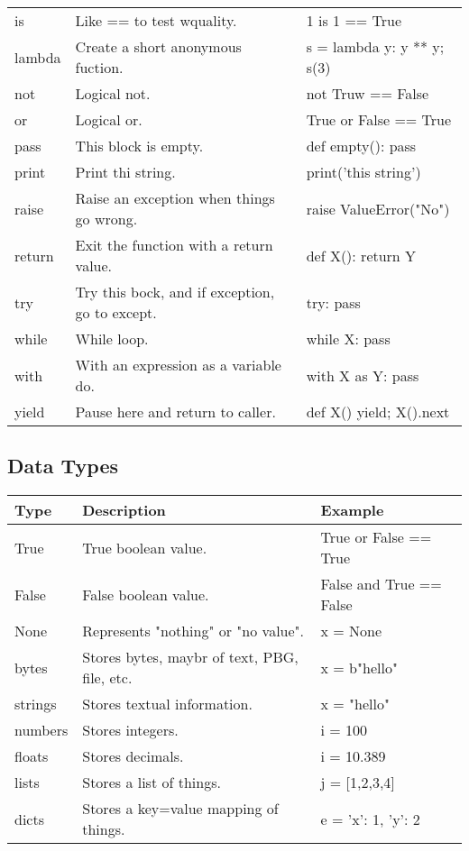 \documentclass[12pt]{article}
\begin{document}
\begin{tabular}{|l|p{3in}|l|}
	is & Like == to test wquality. & 1 is 1 == True\\
	lambda & Create a short anonymous fuction. & s = lambda y: y ** y; s(3)\\
	not & Logical not. & not Truw == False\\
	or & Logical or. & True or False == True\\
	pass & This block is empty. & def empty(): pass\\
	print & Print thi string. & print('this string')\\
	raise & Raise an exception when things go wrong. & raise ValueError("No")\\
	return & Exit the function with a return value. & def X(): return Y\\
	try & Try this bock, and if exception, go to except. & try: pass\\
	while & While loop. & while X: pass\\
	with & With an expression as a variable do. & with X as Y: pass\\
	yield & Pause here and return to caller. & def X() yield; X().next\\

	\hline
\end{tabular}

\subsection{Data Types}
\begin{tabular}{|l|l|p{3in}|}
	\hline
	\textbf{Type} & \textbf{Description} & \textbf{Example}\\ \hline
	True & True boolean value. & True or False == True\\
	False & False boolean value. & False and True == False\\
	None & Represents "nothing" or "no value". & x = None\\
	bytes & Stores bytes, maybr of text, PBG, file, etc. & x = b"hello"\\
	strings & Stores textual information. & x = "hello"\\
	numbers & Stores integers. & i = 100\\
	floats & Stores decimals. & i = 10.389\\
	lists & Stores a list of things. & j = [1,2,3,4]\\
	dicts & Stores a key=value mapping of things. & e = {'x': 1, 'y': 2}\\
	
	\hline
\end{tabular}
\end{document}
